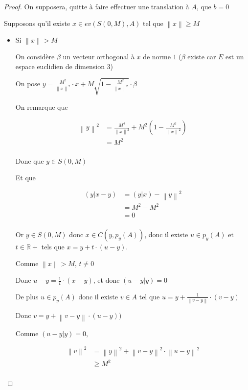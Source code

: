 \documentclass[a4paper]{article}
\newcommand{\norm}[1]{\left\lVert#1\right\rVert}
\begin{document}
    \begin{proof}

    On supposera, quitte à faire effectuer une translation à $A$, que $b = 0$

    Supposons qu'il existe $x \in ev(S(0,M), A)$ tel que $\norm{x} \geqslant M$

    \begin{itemize}
    \item Si $\norm{x} > M$ 

    On considère $\beta$ un vecteur orthogonal à $x$ de norme $1$ ($\beta$ existe car $E$ est un espace euclidien de dimension $3$)

    On pose $y = \frac{M^{2}}{\norm{x}^{2}} \cdot x + M \sqrt{1 - \frac{M^{2}}{\norm{x}^{2}}} \cdot \beta$

    On remarque que 

    \begin{align*}
    \norm{y}^{2} &= \frac{M^{4}}{\norm{x}^{2}} + M^{2} (1 -\frac{M^{2}}{\norm{x}^{2}}) \\
                 &= M^{2}\\
    \end{align*}

    Donc que $y \in S(0, M)$

    Et que

    \begin{align*}
    (y|x - y) &= (y|x) - \norm{y}^{2}\\
              &= M^{2} - M^{2}\\
              &= 0\\
    \end{align*}

    Or $y \in S(0, M)$ donc $x \in C(y, p_{y}(A))$, donc il existe $u\in p_{y}(A)$ et $t\in \mathbb{R}+$ tels que $x = y + t \cdot (u - y)$.

    Comme $\norm{x} > M$, $t\neq 0$

    Donc $u - y = \frac{1}{t} \cdot (x - y)$, et donc $(u - y|y) = 0$

    De plus $u \in p_{y}(A)$ donc il existe $v \in A$ tel que $u = y + \frac{1}{\norm{v -  y}} \cdot (v - y)$

    Donc $v = y + \norm{v - y} \cdot (u - y))$

    Comme $(u - y|y) = 0$,

    \begin{align*}
    \norm{v}^{2} &= \norm{y}^{2} + \norm{v - y}^{2} \cdot \norm{u - y}^{2} \\
                 &\geqslant M^{2} \\
    \end{align*}



\end{itemize}
\end{proof}
\end{document}
